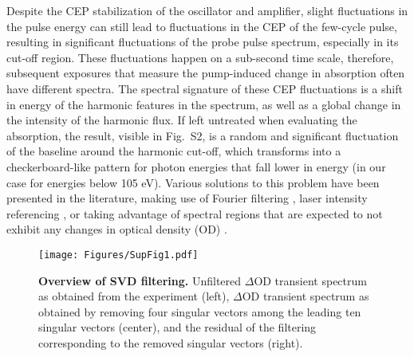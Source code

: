 \documentclass[12pt]{article}
\begin{document}
Despite the CEP stabilization of the oscillator and amplifier, slight fluctuations in the pulse energy can still lead to fluctuations in the CEP of the few-cycle pulse, resulting in significant fluctuations of the probe pulse spectrum, especially in its cut-off region. These fluctuations happen on a sub-second time scale, therefore, subsequent exposures that measure the pump-induced change in absorption often have different spectra. The spectral signature of these CEP fluctuations is a shift in energy of the harmonic features in the spectrum, as well as a global change in the intensity of the harmonic flux. If left untreated when evaluating the absorption, the result, visible in Fig.~S2, is a random and significant fluctuation of the baseline around the harmonic cut-off, which transforms into a checkerboard-like pattern for photon energies that fall lower in energy (in our case for energies below 105 eV). Various solutions to this problem have been presented in the literature, making use of Fourier filtering \cite{stooss2019}, laser intensity referencing \cite{Volkov2019}, or taking advantage of spectral regions that are expected to not exhibit any changes in optical density (OD) \cite{timmers19}. 

\begin{figure}
\texttt{[image: Figures/SupFig1.pdf]}
\label{figs2}
\caption{\textbf{Overview of SVD filtering.} Unfiltered $\Delta$OD transient spectrum as obtained from the experiment (left), $\Delta$OD transient spectrum as obtained by removing four singular vectors among the leading ten singular vectors (center), and the residual of the filtering corresponding to the removed singular vectors (right).}
\end{figure}
\end{document}
